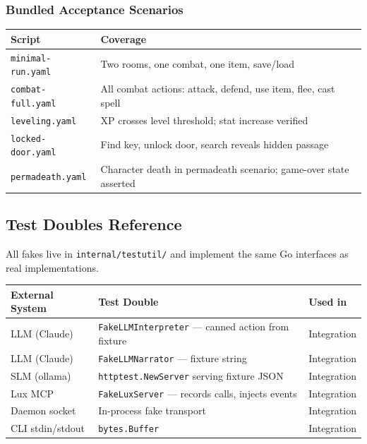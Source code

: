 \documentclass[a4paper,10pt]{article}
\begin{document}
\subsubsection{Bundled Acceptance Scenarios}

\begin{center}
\begin{tabular}{lp{9cm}}
\toprule
\textbf{Script} & \textbf{Coverage} \\
\midrule
\texttt{minimal-run.yaml}  & Two rooms, one combat, one item, save/load \\
\texttt{combat-full.yaml}  & All combat actions: attack, defend, use item, flee, cast spell \\
\texttt{leveling.yaml}     & XP crosses level threshold; stat increase verified \\
\texttt{locked-door.yaml}  & Find key, unlock door, search reveals hidden passage \\
\texttt{permadeath.yaml}   & Character death in permadeath scenario; game-over state asserted \\
\bottomrule
\end{tabular}
\end{center}

\subsection{Test Doubles Reference}

All fakes live in \texttt{internal/testutil/} and implement the
same Go interfaces as real implementations.

\begin{center}
\begin{tabular}{lp{5cm}l}
\toprule
\textbf{External System} & \textbf{Test Double} & \textbf{Used in} \\
\midrule
LLM (Claude)
  & \texttt{FakeLLMInterpreter} --- canned action from fixture
  & Integration \\
LLM (Claude)
  & \texttt{FakeLLMNarrator} --- fixture string
  & Integration \\
SLM (ollama)
  & \texttt{httptest.NewServer} serving fixture JSON
  & Integration \\
Lux MCP
  & \texttt{FakeLuxServer} --- records calls, injects events
  & Integration \\
Daemon socket
  & In-process fake transport
  & Integration \\
CLI stdin/stdout
  & \texttt{bytes.Buffer}
  & Integration \\
\bottomrule
\end{tabular}
\end{center}
\end{document}
